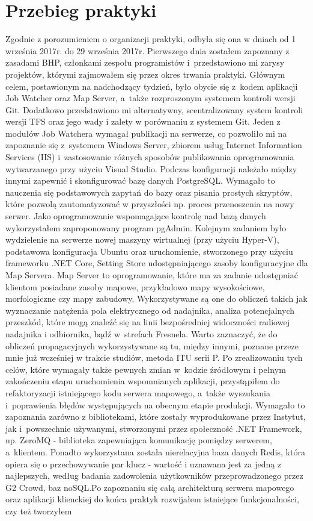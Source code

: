 \documentclass[12pt, a4paper, oneside]{article}
\begin{document}
\section{Przebieg praktyki}
\indent\indent Zgodnie z porozumieniem o organizacji praktyki, odbyła się ona w dniach od 1 września 2017r. do 29 września 2017r. Pierwszego dnia zostałem zapoznany z zasadami BHP, członkami zespołu programistów i~przedstawiono mi zarysy projektów, którymi zajmowałem się przez okres trwania praktyki. Głównym celem, postawionym na nadchodzący tydzień, było obycie się z~kodem aplikacji Job Watcher oraz Map Server, a~także rozproszonym systemem kontroli wersji Git. Dodatkowo przedstawiono mi alternatywny, scentralizowany system kontroli wersji TFS oraz jego wady i zalety w porównaniu z systemem Git. Jeden z modułów Job Watchera wymagał publikacji na serwerze, co pozwoliło mi na zapoznanie się z~systemem Windows Server, zbiorem usług Internet Information Services (IIS) i~zastosowanie różnych sposobów publikowania oprogramowania wytwarzanego przy użyciu Visual Studio. Podczas konfiguracji należało między innymi zapewnić i skonfigurować bazę danych PostgreSQL. Wymagało to nauczenia się podstawowych zapytań do bazy oraz pisania prostych skryptów, które pozwolą zautomatyzować w przyszłości np. proces przenoszenia na nowy serwer. Jako oprogramowanie wspomagające kontrolę nad bazą danych wykorzystałem zaproponowany program pgAdmin. \newline \indent Kolejnym zadaniem było wydzielenie na serwerze nowej maszyny wirtualnej (przy użyciu Hyper-V), podstawowa konfiguracja Ubuntu oraz uruchomienie, stworzonego przy użyciu frameworku .NET Core, Setting Store udostępniającego zasoby konfiguracyjne dla Map Servera. Map Server to oprogramowanie, które ma za zadanie udostępniać klientom posiadane zasoby mapowe, przykładowo mapy wysokościowe, morfologiczne czy mapy zabudowy. Wykorzystywane są one do obliczeń takich jak wyznaczanie natężenia pola elektrycznego od nadajnika, analiza potencjalnych przeszkód, które mogą znaleźć się na linii bezpośredniej widoczności radiowej nadajnika i odbiornika, bądź w~strefach Fresnela. Warto zaznaczyć, że do obliczeń propagacyjnych wykorzystywane są tu, między innymi, poznane przeze mnie już wcześniej w trakcie studiów, metoda ITU serii P. Po zrealizowaniu tych celów, które wymagały także pewnych zmian w~kodzie źródłowym i pełnym zakończeniu etapu uruchomienia wspomnianych aplikacji, przystąpiłem do refaktoryzacji istniejącego kodu serwera mapowego, a~także wyszukania i~poprawienia błędów występujących na obecnym etapie produkcji. Wymagało to zapoznania zarówno z bibliotekami, które zostały wyprodukowane przez Instytut, jak i~powszechnie używanymi, stworzonymi przez społeczność .NET Framework, np. ZeroMQ - biblioteka zapewniająca komunikację pomiędzy serwerem, a~klientem. Ponadto wykorzystana została nierelacyjna baza danych Redis, która opiera się o przechowywanie par klucz - wartość i uznawana jest za jedną z najlepszych, według badania zadowolenia użytkowników przeprowadzonego przez G2 Crowd, baz noSQL.\newline \indent Po zapoznaniu się całą architekturą serwera mapowego oraz aplikacji klienckiej do końca praktyk rozwijałem istniejące funkcjonalności, czy też tworzyłem 
\end{document}
